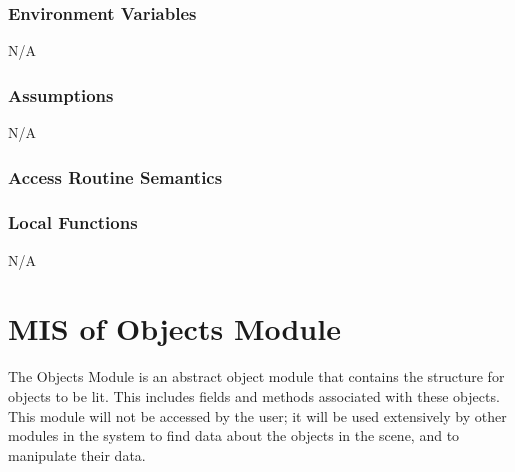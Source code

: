 \documentclass[12pt, titlepage]{article}
\begin{document}
\subsubsection{Environment Variables}
N/A

\subsubsection{Assumptions}
N/A

\subsubsection{Access Routine Semantics}

%

\subsubsection{Local Functions}
N/A

\newpage


\section{MIS of Objects Module} \label{mObjects} 
The Objects Module is an abstract object module that contains the structure for 
objects to be lit. This includes fields and methods associated with these 
objects. This module will not be accessed by the user; it will be used 
extensively by other modules in the system to find data about the objects in 
the scene, and to manipulate their data.
%
%
\end{document}
